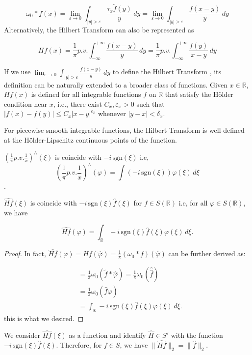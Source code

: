$$\omega_0 * f(x) = \lim_{\varepsilon \rightarrow 0} \int_{|y| > \varepsilon} \frac{\tau_x \tilde{f}(y)}{y} \, dy = \lim_{\varepsilon \rightarrow 0} \int_{|y| > \varepsilon} \frac{f(x-y)}{y} \, dy$$
Alternatively, the Hilbert Transform can also be represented as

$$Hf(x) = \frac{1}{\pi} p.v. \int_{-\infty}^{+\infty} \frac{f(x-y)}{y} \, dy = \frac{1}{\pi} p.v. \int_{-\infty}^{+\infty} \frac{f(y)}{x-y} \, dy$$
\begin{rmk}
    If we use $\lim_{\varepsilon \rightarrow 0} \int_{|y| > \varepsilon} \frac{f(x-y)}{y} \, dy$ to define the Hilbert Transform , its definition can be naturally extended to a broader class of functions. Given $x \in \mathbb{R}$, $Hf(x)$ is defined for all integrable functions $f$ on $\mathbb{R}$ that satisfy the Hölder condition near $x$, i.e., there exist $C_x, \varepsilon_x > 0$ such that $|f(x) - f(y)| \leq C_x |x-y|^{\varepsilon_x}$ whenever $|y-x| < \delta_x$.

For piecewise smooth integrable functions, the Hilbert Transform is well-defined at the Hölder-Lipschitz continuous points of the function.
\end{rmk} 
\begin{proposition}
    $\left(\frac{1}{\pi} p.v. \frac{1}{x}\right)^{\wedge}(\xi) $ is coincide with $ -i \, \text{sgn}(\xi)$ i.e,  $$\left(\frac{1}{\pi} p.v. \frac{1}{x}\right)^{\wedge}(\varphi) = \int (-i \, \text{sgn}(\xi)) \varphi(\xi) \, d\xi$$.
\end{proposition}
\begin{proposition}
    $\widehat{Hf}(\xi) $ is coincide with $ -i \, \text{sgn}(\xi) \hat{f}(\xi)$ for $f \in S(\mathbb{R})$ i.e, for all $\varphi \in S(\mathbb{R})$, we have

$$\widehat{Hf}(\varphi) = \int_{\mathbb{R}} -i \, \text{sgn}(\xi) \hat{f}(\xi) \varphi(\xi) \, d\xi.$$
\end{proposition}
\begin{proof}
    In fact, $\widehat{Hf}(\varphi) = Hf(\hat{\varphi}) = \frac{1}{\pi}(\omega_0 * f)(\hat{\varphi})$ can be further derived as:

$$\begin{aligned}
&= \frac{1}{\pi} \omega_0(\tilde{f} * \hat{\varphi}) = \frac{1}{\pi} \omega_0(\widehat{\hat{f}}) \\
&= \frac{1}{\pi} \omega_0(\hat{f} \varphi) \\
&= \int_{\mathbb{R}} -i \, \text{sgn}(\xi) \hat{f}(\xi) \varphi(\xi) \, d\xi.
\end{aligned}$$
this is what we desired.
\end{proof}
We consider $\widehat{Hf}(\xi)$ as a function and identify $\hat{H} \in S'$ with the function $-i \, \text{sgn}(\xi) \hat{f}(\xi)$. Therefore, for $f \in S$, we have $\|\hat{Hf}\|_2 = \|\hat{f}\|_2$.

